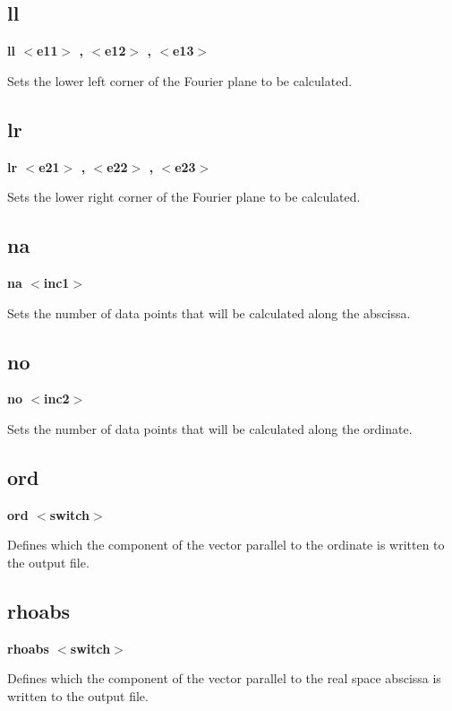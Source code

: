\subsection*{ll}
{\bf ll $ <$e11$> $ , $ <$e12$> $ , $ <$e13$> $ \par }
\par
\vspace{3pt}
Sets the lower left corner of the Fourier plane to be calculated. 
\subsection*{lr}
{\bf lr $ <$e21$> $ , $ <$e22$> $ , $ <$e23$> $ \par }
\par
\vspace{3pt}
Sets the lower right corner of the Fourier plane to be calculated. 
\subsection*{na}
{\bf na $ <$inc1$> $ \par }
\par
\vspace{3pt}
Sets the number of data points that will be calculated along the 
abscissa. 
\subsection*{no}
{\bf no $ <$inc2$> $ \par }
\par
\vspace{3pt}
Sets the number of data points that will be calculated along the 
ordinate. 
\subsection*{ord}
{\bf ord $ <$switch$> $ \par }
\par
\vspace{3pt}
Defines which the component of the vector parallel to the ordinate 
is written to the output file. 
\subsection*{rhoabs}
{\bf rhoabs $ <$switch$> $ \par }
\par
\vspace{3pt}
Defines which the component of the vector parallel to the 
real space abscissa is written to the output file. 
